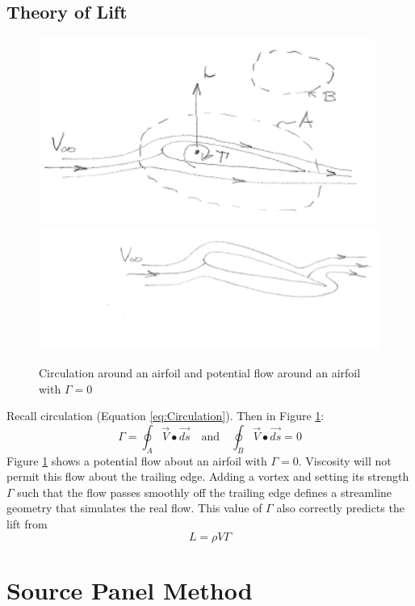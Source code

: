 \documentclass[draft=false, titlepage]{article}
\begin{document}
\subsection{Theory of Lift}
\begin{figure}[ht]
    \centering
    \includegraphics[width=0.4\linewidth]{Figures/circulationAroundAirfoil.PNG}
    \includegraphics[width=0.5\linewidth]{Figures/liftingFlowOverAirfoil.PNG}
    \caption{Circulation around an airfoil and potential flow around an airfoil with $\Gamma=0$}
    \label{fig:CirculationFlowAirfoil}
\end{figure}
Recall circulation (Equation \ref{eq:Circulation}). Then in Figure \ref{fig:CirculationFlowAirfoil}:
\begin{equation*}
    \Gamma = \oint_A \vec{V} \bullet \vec{ds} \quad\text{and}\quad \oint_B \vec{V} \bullet \vec{ds} = 0
\end{equation*}
Figure \ref{fig:CirculationFlowAirfoil} shows a potential flow about an airfoil with $\Gamma=0$. Viscosity will not permit this flow about the trailing edge. Adding a vortex and setting its strength $\Gamma$ such that the flow passes smoothly off the trailing edge defines a streamline geometry that simulates the real flow. This value of $\Gamma$ also correctly predicts the lift from
\begin{equation*}
L = \rho V \Gamma
\end{equation*}

\section{Source Panel Method}
\end{document}
